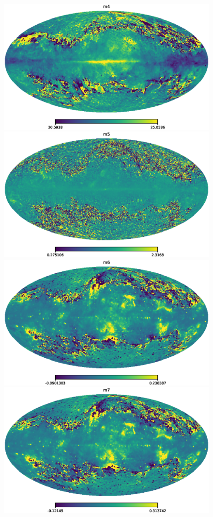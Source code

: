 \begin{figure}[htbp]
 \includegraphics[width=\mwidths]{m-maps/map_m4.eps}
 \includegraphics[width=\mwidths]{m-maps/map_m5.eps}
 \includegraphics[width=\mwidths]{m-maps/map_m6.eps}
 \includegraphics[width=\mwidths]{m-maps/map_m7.eps}

\end{figure}
